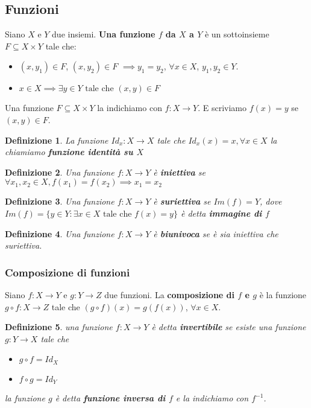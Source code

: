 \documentclass[a4paper,12pt]{article}
\theoremstyle{def}
\newtheorem*{definition}{Definizione}
\theoremstyle{prop}
\theoremstyle{esempio}
\theoremstyle{dimostrazione}
\theoremstyle{teo}
\theoremstyle{osservazione}
\begin{document}
\subsection{Funzioni}

Siano \(X\) e \(Y\) due insiemi. \textbf{Una funzione \(f\) da \(X\) a \(Y\)} è un sottoinsieme \(F \subseteq X \times Y\)
tale che:
\begin{itemize}
	\item \((x, y_1) \in F\), \((x,y_2) \in F\) \(\implies y_1 = y_2\), \(\forall x \in X\), \(y_1,y_2 \in Y\).
	\item \(x \in X \implies \exists y \in Y \text{ tale che } (x,y) \in F\)
\end{itemize}


Una funzione \(F \subseteq X \times Y\) la indichiamo con \(f : X \to Y\). E scriviamo \(f(x) = y\) se \((x,y) \in F\).


\begin{definition}
	La funzione \(Id_x : X \rightarrow X \) tale che \(Id_x (x) = x, \forall x \in X\) la chiamiamo \textbf{funzione
		identità su \(X\)}
\end{definition}

\begin{definition}
	Una funzione \(f: X \rightarrow Y\) è \textbf{iniettiva} se \(\forall x_1, x_2 \in X, f(x_1) = f(x_2)
	\implies x_1 = x_2\)
\end{definition}

\begin{definition}
	Una funzione \(f: X \rightarrow Y\) è \textbf{suriettiva} se \(Im(f) = Y\), dove \(Im(f) = \{ y \in Y :
	\exists x \in X \text{ tale che } f(x) = y \}\) è detta \textbf{immagine di \(f\)}
\end{definition}

\begin{definition}
	Una funzione \(f: X \rightarrow Y\) è \textbf{biunivoca} se è sia iniettiva che suriettiva.
\end{definition}

\subsubsection{Composizione di funzioni}
Siano \(f: X \rightarrow Y\) e \(g: Y \rightarrow Z\) due funzioni. La \textbf{composizione di \(f\) e \(g\)}
è la funzione \(g \circ f : X \rightarrow Z\) tale che \((g \circ f)(x) = g(f(x))\), \(\forall x \in X\).

\begin{definition}
	una funzione \(f: X \rightarrow Y\) è detta \textbf{invertibile} se esiste una funzione \(g: Y \rightarrow X\) tale che
	\begin{itemize}
		\item \(g \circ f = Id_X\)
		\item \(f \circ g = Id_Y\)
	\end{itemize}
	la funzione \(g\) è detta \textbf{funzione inversa di \(f\)} e la indichiamo con \(f^{-1}\).
\end{definition}
\end{document}
